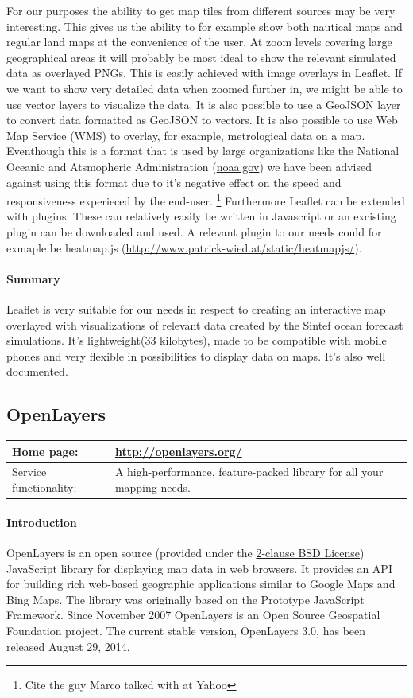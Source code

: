 \documentclass[11pt,a4paper,titlepage,oneside]{report}
\begin{document}
    For our purposes the ability to get map tiles from different sources may be very interesting. This gives us the ability to for example show both nautical maps and regular land maps at the convenience of the user. At zoom levels covering large geographical areas it will probably be most ideal to show the relevant simulated data as overlayed PNGs. This is easily achieved with image overlays in Leaflet. If we want to show very detailed data when zoomed further in, we might be able to use vector layers to visualize the data. It is also possible to use a GeoJSON layer to convert data formatted as GeoJSON to vectors.
    It is also possible to use Web Map Service (WMS) to overlay, for example, metrological data on a map. Eventhough this is a format that is used by large organizations like the National Oceanic and Atsmopheric Administration (\url{noaa.gov}) we have been advised against using this format due to it's negative effect on the speed and responsiveness experieced by the end-user. \footnote{Cite the guy Marco talked with at Yahoo}
    Furthermore Leaflet can be extended with plugins. These can relatively easily be written in Javascript or an excisting plugin can be downloaded and used. A relevant plugin to our needs could for exmaple be heatmap.js (\url{http://www.patrick-wied.at/static/heatmapjs/}).

    \paragraph{Summary}
    Leaflet is very suitable for our needs in respect to creating an interactive map overlayed with visualizations of relevant data created by the Sintef ocean forecast simulations. It's lightweight(33 kilobytes), made to be compatible with mobile phones and very flexible in possibilities to display data on maps. It's also well documented.

  \subsection{OpenLayers}
   \begin{tabular}{|p{4cm}|p{8cm}|}
     \hline
     Home page: & \url{http://openlayers.org/} \\
     \hline
     Service functionality: & A high-performance, feature-packed library for all your mapping needs. \\
     \hline
   \end{tabular}
   \paragraph{Introduction} \indent
   OpenLayers is an open source (provided under the \href{'https://github.com/Leaflet/Leaflet/blob/master/LICENSE'}{2-clause BSD License}) JavaScript library for displaying map data in web browsers. It provides an API for building rich web-based geographic applications similar to Google Maps and Bing Maps. The library was originally based on the Prototype JavaScript Framework. Since November 2007 OpenLayers is an Open Source Geospatial Foundation project.
   The current stable version, OpenLayers 3.0, has been released August 29, 2014.
\end{document}
